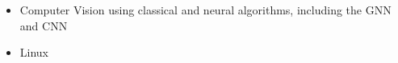 \begin{itemize}
	\item Computer Vision using classical and neural algorithms, including the GNN and CNN
	\item Linux
\end{itemize}

